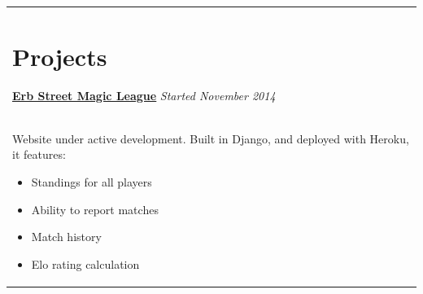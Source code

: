 \documentclass[10pt]{article}
\begin{document}
\begin{minipage}{0.8\textwidth}
\begin{tabular}{!{\color{resorange}\vrule}p{\textwidth}}
\section*{\sffamily\color{resblue}Projects}
{\bf \color{blue} \href{http://erbmagicleague.herokuapp.com/}{\underline{Erb Street Magic League}}} \hfill {\it Started November 2014}\medskip \\
Website under active development. Built in Django, and deployed with Heroku, it features:
  \begin{itemize}
  \setlength\itemsep{0em}
    \item Standings for all players
    \item Ability to report matches
    \item Match history
    \item Elo rating calculation
  \end{itemize}
\end{tabular}
\end{minipage}
\end{document}
